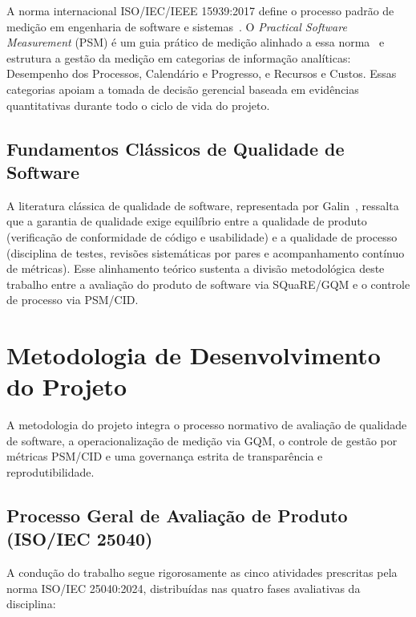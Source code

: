 \documentclass[journal]{IEEEtran}
\begin{document}
A norma internacional ISO/IEC/IEEE 15939:2017 define o processo padrão de medição em engenharia de software e sistemas~\cite{iso15939}. O \textit{Practical Software Measurement} (PSM) é um guia prático de medição alinhado a essa norma~\cite{mcgarry2002psm} e estrutura a gestão da medição em categorias de informação analíticas: Desempenho dos Processos, Calendário e Progresso, e Recursos e Custos. Essas categorias apoiam a tomada de decisão gerencial baseada em evidências quantitativas durante todo o ciclo de vida do projeto.

\subsection{Fundamentos Clássicos de Qualidade de Software}
\label{sec:galin}

A literatura clássica de qualidade de software, representada por Galin~\cite{galin2018}, ressalta que a garantia de qualidade exige equilíbrio entre a qualidade de produto (verificação de conformidade de código e usabilidade) e a qualidade de processo (disciplina de testes, revisões sistemáticas por pares e acompanhamento contínuo de métricas). Esse alinhamento teórico sustenta a divisão metodológica deste trabalho entre a avaliação do produto de software via SQuaRE/GQM e o controle de processo via PSM/CID.

\section{Metodologia de Desenvolvimento do Projeto}
\label{sec:metodologia}

A metodologia do projeto integra o processo normativo de avaliação de qualidade de software, a operacionalização de medição via GQM, o controle de gestão por métricas PSM/CID e uma governança estrita de transparência e reprodutibilidade.

\subsection{Processo Geral de Avaliação de Produto (ISO/IEC 25040)}
\label{sec:processo_avaliacao}

A condução do trabalho segue rigorosamente as cinco atividades prescritas pela norma ISO/IEC 25040:2024, distribuídas nas quatro fases avaliativas da disciplina:
\end{document}
